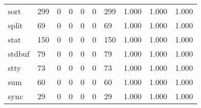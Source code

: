\begin{longtable}{lp{2.0cm}p{2.0cm}p{2.0cm}p{2.0cm}p{2.0cm}p{2.0cm}p{2.0cm}p{2.0cm}p{2.0cm}}
sort      &                    299 &                                             0 &                                            0 &                                           0 &                                            0 &                                        299 &                                1.000 &                                  1.000 &                                1.000 \\
split     &                     69 &                                             0 &                                            0 &                                           0 &                                            0 &                                         69 &                                1.000 &                                  1.000 &                                1.000 \\
stat      &                    150 &                                             0 &                                            0 &                                           0 &                                            0 &                                        150 &                                1.000 &                                  1.000 &                                1.000 \\
stdbuf    &                     79 &                                             0 &                                            0 &                                           0 &                                            0 &                                         79 &                                1.000 &                                  1.000 &                                1.000 \\
stty      &                     73 &                                             0 &                                            0 &                                           0 &                                            0 &                                         73 &                                1.000 &                                  1.000 &                                1.000 \\
sum       &                     60 &                                             0 &                                            0 &                                           0 &                                            0 &                                         60 &                                1.000 &                                  1.000 &                                1.000 \\
sync      &                     29 &                                             0 &                                            0 &                                           0 &                                            0 &                                         29 &                                1.000 &                                  1.000 &                                1.000 \\

\end{longtable}

